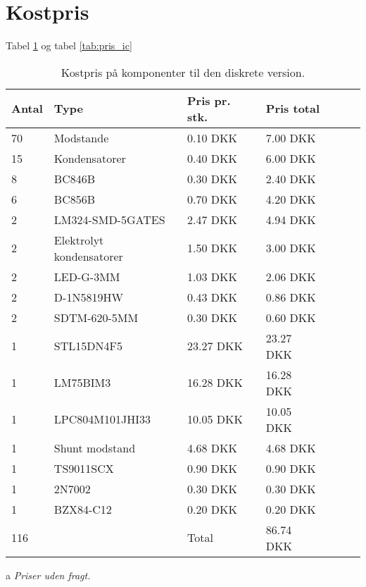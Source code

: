 \section{Kostpris} \label{sec:sammenligning_kostpris}

Tabel \ref{tab:pris_diskret} og tabel \ref{tab:pris_ic}

\begin{table}[h!]
	\small
	\centering
	\begin{threeparttable}
		\begin{tabular}{ l l l l l l l }
			\toprule
			\multicolumn{1}{l}{\textbf{Antal}}          &
			\multicolumn{1}{l}{\textbf{Type}}           &
			\multicolumn{1}{l}{\textbf{Pris pr. stk.}}  &
			\multicolumn{1}{l}{\textbf{Pris total}}   \\ 
			\hline
			70 &  Modstande                 &  0.10 DKK   &  7.00 DKK  \\
			15 &  Kondensatorer             &  0.40 DKK   &  6.00 DKK  \\
		    8  &  BC846B                    &  0.30 DKK   &  2.40 DKK  \\
		    6  &  BC856B                    &  0.70 DKK   &  4.20 DKK  \\
		    2  &  LM324-SMD-5GATES          &  2.47 DKK   &  4.94 DKK  \\ 
			2  &  Elektrolyt kondensatorer  &  1.50 DKK   &  3.00 DKK  \\
			2  &  LED-G-3MM                 &  1.03 DKK   &  2.06 DKK  \\
	 	    2  &  D-1N5819HW                &  0.43 DKK   &  0.86 DKK  \\
	 	    2  &  SDTM-620-5MM              &  0.30 DKK   &  0.60 DKK  \\ 
		    1  &  STL15DN4F5                & 23.27 DKK   & 23.27 DKK  \\
		    1  &  LM75BIM3                  & 16.28 DKK   & 16.28 DKK  \\
		   	1  &  LPC804M101JHI33           & 10.05 DKK   & 10.05 DKK  \\
		   	1  &  Shunt modstand            &  4.68 DKK   &  4.68 DKK  \\
		   	1  &  TS9011SCX                 &  0.90 DKK   &  0.90 DKK  \\
  			1  &  2N7002                    &  0.30 DKK   &  0.30 DKK  \\
	  	    1  &  BZX84-C12                 &  0.20 DKK   &  0.20 DKK  \\
	        \hline
	  	   116 &                            & Total       & 86.74 DKK  \\  
			\hline
			\bottomrule
		\end{tabular}
		\begin{tablenotes}
		\item[a] \textit{Priser uden fragt.}
		\end{tablenotes}
		\caption{Kostpris på komponenter til den diskrete version.}
		\label{tab:pris_diskret}
	\end{threeparttable}
\end{table} 
\FloatBlock



